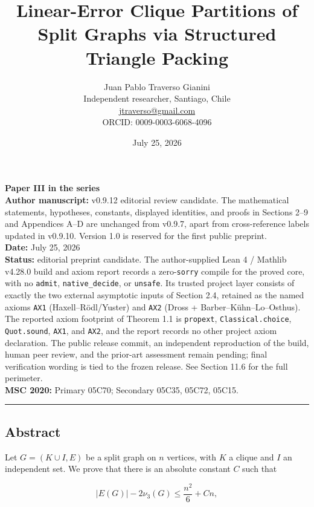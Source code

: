 \documentclass[
  11pt,
]{article}
\title{Linear-Error Clique Partitions of Split Graphs via Structured Triangle Packing}
\author{Juan Pablo Traverso Gianini\\
\small Independent researcher, Santiago, Chile\\
\small \href{mailto:jtraverso@gmail.com}{jtraverso@gmail.com}\\
\small ORCID: 0009-0003-6068-4096}
\date{July 25, 2026}
\begin{document}
\sloppy
\raggedbottom
\maketitle
\begin{small}\begin{raggedright}
\textbf{Paper III in the series}\\
\textbf{Author manuscript:} v0.9.12 editorial review candidate. The mathematical statements, hypotheses, constants, displayed identities, and proofs in Sections 2--9 and Appendices A--D are unchanged from v0.9.7, apart from cross-reference labels updated in v0.9.10. Version 1.0 is reserved for the first public preprint.\\
\textbf{Date:} July 25, 2026\\
\textbf{Status:} editorial preprint candidate. The author-supplied Lean 4 / Mathlib v4.28.0 build and axiom report records a zero-\texttt{sorry} compile for the proved core, with no \texttt{admit}, \texttt{native\_decide}, or \texttt{unsafe}. Its trusted project layer consists of exactly the two external asymptotic inputs of Section 2.4, retained as the named axioms \texttt{AX1} (Haxell--Rödl/Yuster) and \texttt{AX2} (Dross + Barber--Kühn--Lo--Osthus). The reported axiom footprint of Theorem 1.1 is \texttt{propext}, \texttt{Classical.choice}, \texttt{Quot.sound}, \texttt{AX1}, and \texttt{AX2}, and the report records no other project axiom declaration. The public release commit, an independent reproduction of the build, human peer review, and the prior-art assessment remain pending; final verification wording is tied to the frozen release. See Section 11.6 for the full perimeter.\\
\textbf{MSC 2020:} Primary 05C70; Secondary 05C35, 05C72, 05C15.
\begin{center}\rule{0.5\linewidth}{0.5pt}\end{center}
\end{raggedright}\end{small}

\subsection{Abstract}\label{abstract}

Let \(G=(K\cup I,E)\) be a split graph on \(n\) vertices, with \(K\) a clique and \(I\) an independent set. We prove that there is an absolute constant \(C\) such that

\[
|E(G)|-2\nu_3(G)
\le
\frac{n^2}{6}+Cn,
\]
\end{document}
